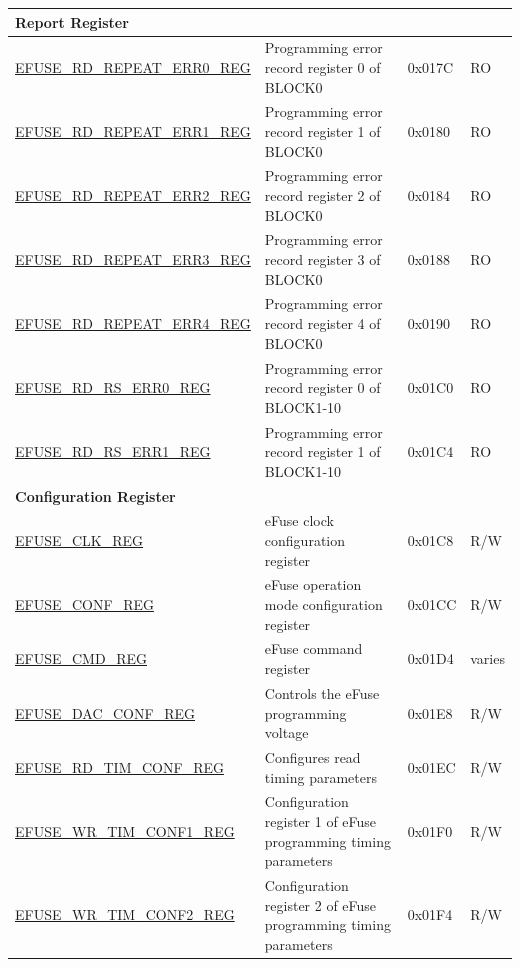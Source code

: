 \begin{longtable}{ | p{6.8cm} | p{7cm} | p{1.3cm} | p{1.2cm} | }
\multicolumn{4}{|l|}{\textbf{Report Register}} \\ \hline
\hyperref[regdesc:EFUSERDREPEATERR0REG]{EFUSE\_RD\_REPEAT\_ERR0\_REG} & Programming error record register 0 of BLOCK0 & 0x017C & RO \\ \hline
\hyperref[regdesc:EFUSERDREPEATERR1REG]{EFUSE\_RD\_REPEAT\_ERR1\_REG} & Programming error record register 1 of BLOCK0 & 0x0180 & RO \\ \hline
\hyperref[regdesc:EFUSERDREPEATERR2REG]{EFUSE\_RD\_REPEAT\_ERR2\_REG} & Programming error record register 2 of BLOCK0 & 0x0184 & RO \\ \hline
\hyperref[regdesc:EFUSERDREPEATERR3REG]{EFUSE\_RD\_REPEAT\_ERR3\_REG} & Programming error record register 3 of BLOCK0 & 0x0188 & RO \\ \hline
\hyperref[regdesc:EFUSERDREPEATERR4REG]{EFUSE\_RD\_REPEAT\_ERR4\_REG} & Programming error record register 4 of BLOCK0 & 0x0190 & RO \\ \hline
\hyperref[regdesc:EFUSERDRSERR0REG]{EFUSE\_RD\_RS\_ERR0\_REG} & Programming error record register 0 of BLOCK1-10 & 0x01C0 & RO \\ \hline
\hyperref[regdesc:EFUSERDRSERR1REG]{EFUSE\_RD\_RS\_ERR1\_REG} & Programming error record register 1 of BLOCK1-10 & 0x01C4 & RO \\ \hline
\multicolumn{4}{|l|}{\textbf{Configuration Register}} \\ \hline
\hyperref[regdesc:EFUSECLKREG]{EFUSE\_CLK\_REG} & eFuse clock configuration register & 0x01C8 & R/W \\ \hline
\hyperref[regdesc:EFUSECONFREG]{EFUSE\_CONF\_REG} & eFuse operation mode configuration register & 0x01CC & R/W \\ \hline
\hyperref[regdesc:EFUSECMDREG]{EFUSE\_CMD\_REG} & eFuse command register & 0x01D4 & varies \\ \hline
\hyperref[regdesc:EFUSEDACCONFREG]{EFUSE\_DAC\_CONF\_REG} & Controls the eFuse programming voltage & 0x01E8 & R/W \\ \hline
\hyperref[regdesc:EFUSERDTIMCONFREG]{EFUSE\_RD\_TIM\_CONF\_REG} & Configures read timing parameters & 0x01EC & R/W \\ \hline
\hyperref[regdesc:EFUSEWRTIMCONF1REG]{EFUSE\_WR\_TIM\_CONF1\_REG} & Configuration register 1 of eFuse programming timing parameters & 0x01F0 & R/W \\ \hline
\hyperref[regdesc:EFUSEWRTIMCONF2REG]{EFUSE\_WR\_TIM\_CONF2\_REG} & Configuration register 2 of eFuse programming timing parameters & 0x01F4 & R/W \\ \hline

\end{longtable}
